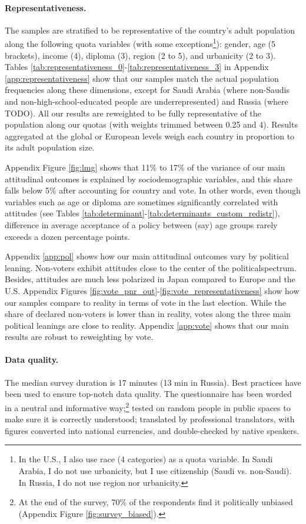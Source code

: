 \documentclass[12pt,english]{article}
\begin{document}
\begin{bibunit}
\paragraph{Representativeness.}
The samples are stratified to be representative of the country's adult population along the following quota variables (with some exceptions\footnote{In the U.S., I also use race (4 categories) as a quota variable. In Saudi Arabia, I do not use urbanicity, but I use citizenship (Saudi vs. non-Saudi). In Russia, I do not use region nor urbanicity.}): gender, age (5 brackets), income (4), diploma (3), region (2 to 5), and urbanicity (2 to 3). Tables \ref{tab:representativeness_0}-\ref{tab:representativeness_3} in Appendix \ref{app:representativeness} show that our samples match the actual population frequencies along these dimensions, except for Saudi Arabia (where non-Saudis and non-high-school-educated people are underrepresented) and Russia (where TODO). All our results are reweighted to be fully representative of the population along our quotas (with weights trimmed between 0.25 and 4). Results aggregated at the global or European levels weigh each country in proportion to its adult population size. 

Appendix Figure \ref{fig:lmg} shows that 11\% to 17\% of the variance of our main attitudinal outcomes is explained by sociodemographic variables, and this share falls below 5\% after accounting for country and vote. In other words, even though variables such as age or diploma are sometimes significantly correlated with attitudes (see Tables \ref{tab:determinant}-\ref{tab:determinants_custom_redistr}), difference in average acceptance of a policy between (say) age groups rarely exceeds a dozen percentage points. 

Appendix \ref{app:pol} shows how our main attitudinal outcomes vary by political leaning. Non-voters exhibit attitudes close to the center of the politicalspectrum. Besides, attitudes are much less polarized in Japan compared to Europe and the U.S. %
Appendix Figures \ref{fig:vote_pnr_out}-\ref{fig:vote_representativeness} show how our %
samples compare to reality in terms of vote in the last election. While the share of declared non-voters is lower than in reality, votes along the three main political leanings are close to reality. Appendix \ref{app:vote} shows that our main results are robust to reweighting by vote. 

\paragraph{Data quality.} 
The median survey duration is 17 minutes (13 min in Russia). %
Best practices have been used to ensure top-notch data quality. 
The questionnaire has been worded in a neutral and informative way;\footnote{At the end of the survey, 70\% of the respondents find it politically unbiased (Appendix Figure \ref{fig:survey_biased}).} tested on random people in public spaces to make sure it is correctly understood; translated by professional translators, with figures converted into national currencies, and double-checked by native speakers.


\end{bibunit}
\end{document}
